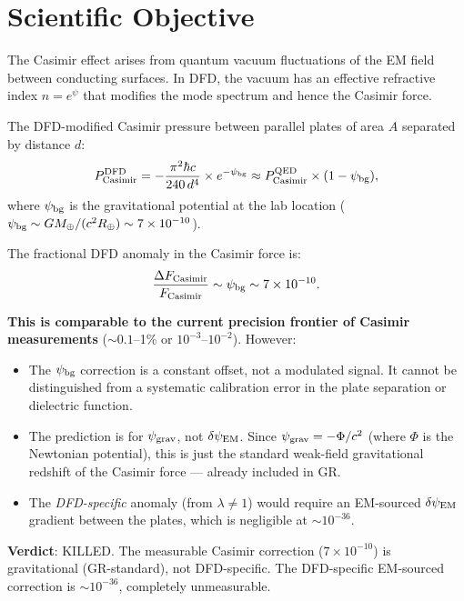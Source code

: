 \documentclass[11pt]{article}
\newcommand{\ee}[1]{\times 10^{#1}}
\newcommand{\dpsi}{\delta\psi}
\begin{document}
\section{Scientific Objective}

The Casimir effect arises from quantum vacuum fluctuations of the
EM field between conducting surfaces. In DFD, the vacuum has an
effective refractive index $n = e^\psi$ that modifies the mode
spectrum and hence the Casimir force.

The DFD-modified Casimir pressure between parallel plates of area $A$
separated by distance $d$:
\begin{equation}
P_{\rm Casimir}^{\rm DFD} = -\frac{\pi^2 \hbar c}{240\,d^4}
\times e^{-\psi_{\rm bg}} \approx P_{\rm Casimir}^{\rm QED}
\times (1 - \psi_{\rm bg}),
\end{equation}
where $\psi_{\rm bg}$ is the gravitational potential at the lab location
($\psi_{\rm bg} \sim GM_\oplus/(c^2 R_\oplus) \sim 7\ee{-10}$).

The fractional DFD anomaly in the Casimir force is:
\begin{equation}
\frac{\Delta F_{\rm Casimir}}{F_{\rm Casimir}} \sim \psi_{\rm bg}
\sim 7\ee{-10}.
\end{equation}

\textbf{This is comparable to the current precision frontier of Casimir
measurements} ($\sim 0.1$--1\% or $10^{-3}$--$10^{-2}$). However:

\begin{itemize}[nosep]
\item The $\psi_{\rm bg}$ correction is a constant offset, not a
  modulated signal. It cannot be distinguished from a systematic
  calibration error in the plate separation or dielectric function.
\item The prediction is for $\psi_{\rm grav}$, not $\dpsi_{\rm EM}$.
  Since $\psi_{\rm grav} = -\Phi/c^2$ (where $\Phi$ is the Newtonian
  potential), this is just the standard weak-field gravitational
  redshift of the Casimir force --- already included in GR.
\item The \emph{DFD-specific} anomaly (from $\lambda \neq 1$) would
  require an EM-sourced $\dpsi_{\rm EM}$ gradient between the plates,
  which is negligible at $\sim 10^{-36}$.
\end{itemize}

\textbf{Verdict}: KILLED. The measurable Casimir correction ($7\ee{-10}$)
is gravitational (GR-standard), not DFD-specific. The DFD-specific
EM-sourced correction is $\sim 10^{-36}$, completely unmeasurable.
\end{document}
